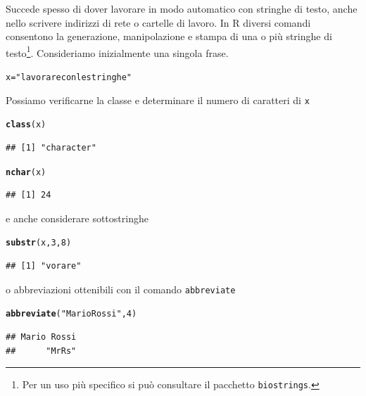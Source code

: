 \documentclass[onecolumn,12pt]{book}\usepackage[]{graphicx}\usepackage[]{color}
\makeatletter
\newcommand{\hlnum}[1]{\textcolor[rgb]{0.686,0.059,0.569}{#1}}%
\newcommand{\hlstr}[1]{\textcolor[rgb]{0.192,0.494,0.8}{#1}}%
\newcommand{\hlstd}[1]{\textcolor[rgb]{0.345,0.345,0.345}{#1}}%
\newcommand{\hlkwb}[1]{\textcolor[rgb]{0.69,0.353,0.396}{#1}}%
\newcommand{\hlkwd}[1]{\textcolor[rgb]{0.737,0.353,0.396}{\textbf{#1}}}%
\newenvironment{kframe}{%
 \def\at@end@of@kframe{}%
 \ifinner\ifhmode%
  \def\at@end@of@kframe{\end{minipage}}%
  \begin{minipage}{\columnwidth}%
 \fi\fi%
 \def\FrameCommand##1{\hskip\@totalleftmargin \hskip-\fboxsep
 \colorbox{shadecolor}{##1}\hskip-\fboxsep
     \hskip-\linewidth \hskip-\@totalleftmargin \hskip\columnwidth}%
 \MakeFramed {\advance\hsize-\width
   \@totalleftmargin\z@ \linewidth\hsize
   \@setminipage}}%
 {\par\unskip\endMakeFramed%
 \at@end@of@kframe}
\newenvironment{knitrout}{}{} %
\makeatother
\begin{document}
Succede spesso di dover lavorare in modo automatico con stringhe di testo, anche nello scrivere indirizzi di rete o cartelle di lavoro. In  \textsf{R} diversi comandi consentono la  generazione, manipolazione e stampa di una o pi\`u stringhe di testo\footnote{Per un  uso pi\`u specifico si pu\`o consultare il pacchetto \texttt{biostrings}.}. Consideriamo inizialmente una singola frase.
\begin{knitrout}
\color{fgcolor}\begin{kframe}
\begin{alltt}
\hlstd{x}\hlkwb{=}\hlstr{"lavorare con le stringhe"}
\end{alltt}
\end{kframe}
\end{knitrout}
Possiamo verificarne la classe e determinare il numero di caratteri di \texttt{x}
\begin{knitrout}
\color{fgcolor}\begin{kframe}
\begin{alltt}
\hlkwd{class}\hlstd{(x)}
\end{alltt}
\begin{verbatim}
## [1] "character"
\end{verbatim}
\begin{alltt}
\hlkwd{nchar}\hlstd{(x)}
\end{alltt}
\begin{verbatim}
## [1] 24
\end{verbatim}
\end{kframe}
\end{knitrout}
e anche considerare sottostringhe
\begin{knitrout}
\color{fgcolor}\begin{kframe}
\begin{alltt}
\hlkwd{substr}\hlstd{(x,}\hlnum{3}\hlstd{,}\hlnum{8}\hlstd{)}
\end{alltt}
\begin{verbatim}
## [1] "vorare"
\end{verbatim}
\end{kframe}
\end{knitrout}
o  abbreviazioni ottenibili con il comando \texttt{abbreviate} 
\begin{knitrout}
\color{fgcolor}\begin{kframe}
\begin{alltt}
\hlkwd{abbreviate}\hlstd{(}\hlstr{"Mario Rossi"}\hlstd{,}\hlnum{4}\hlstd{)}
\end{alltt}
\begin{verbatim}
## Mario Rossi 
##      "MrRs"
\end{verbatim}
\end{kframe}
\end{knitrout}
\end{document}
